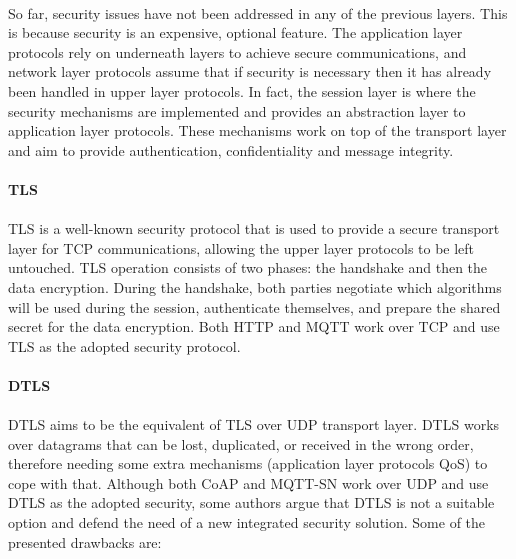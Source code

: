 \paragraph{}
So far, security issues have not been addressed in any of the previous layers. This is because security is an expensive, optional feature. The application layer protocols rely on underneath layers to achieve secure communications, and network layer protocols assume that if security is necessary then it has already been handled in upper layer protocols. In fact, the session layer is where the security mechanisms are implemented and provides an abstraction layer to application layer protocols. These mechanisms work on top of the transport layer and aim to provide authentication, confidentiality and message integrity.

\paragraph{\textbf{\ac{TLS}}}
\paragraph{}
	\ac{TLS} is a well-known security protocol that is used to provide a secure transport layer for \ac{TCP} communications, allowing the upper layer protocols to be left untouched. \ac{TLS} operation consists of two phases: the handshake and then the data encryption. During the handshake, both parties negotiate which algorithms will be used during the session, authenticate themselves, and prepare the shared secret for the data encryption.
	Both \ac{HTTP} and \ac{MQTT} work over \ac{TCP} and use \ac{TLS} as the adopted security protocol.

\paragraph{\textbf{\ac{DTLS}}}
\paragraph{}
	\ac{DTLS} aims to be the equivalent of \ac{TLS} over \ac{UDP} transport layer. \ac{DTLS} works over datagrams that can be lost, duplicated, or received in the wrong order, therefore needing some extra mechanisms (application layer protocols \ac{QoS}) to cope with that. Although both \ac{CoAP} and \ac{MQTT-SN} work over \ac{UDP} and use \ac{DTLS} as the adopted security, some authors argue that \ac{DTLS} is not a suitable option \cite{Alghamdi2013} and defend the need of a new integrated security solution. Some of the presented drawbacks are:

